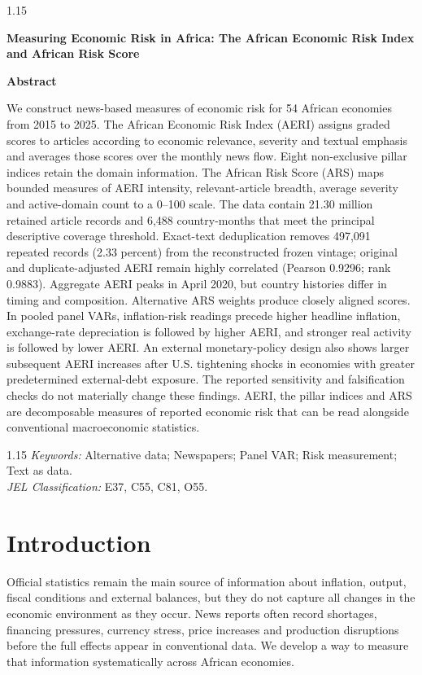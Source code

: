 \documentclass[12pt]{article}
\begin{document}
\thispagestyle{plain}
\begin{center}
\begin{spacing}{1.15}
{\Large\bfseries Measuring Economic Risk in Africa: The African Economic Risk Index and African Risk Score\par}
\end{spacing}
\end{center}
\begin{center}\textbf{Abstract}\end{center}\vspace{-6pt}
\noindent We construct news-based measures of economic risk for 54 African economies from 2015 to 2025. The African Economic Risk Index (AERI) assigns graded scores to articles according to economic relevance, severity and textual emphasis and averages those scores over the monthly news flow. Eight non-exclusive pillar indices retain the domain information. The African Risk Score (ARS) maps bounded measures of AERI intensity, relevant-article breadth, average severity and active-domain count to a 0--100 scale. The data contain 21.30 million retained article records and 6,488 country-months that meet the principal descriptive coverage threshold. Exact-text deduplication removes 497,091 repeated records (2.33 percent) from the reconstructed frozen vintage; original and duplicate-adjusted AERI remain highly correlated (Pearson 0.9296; rank 0.9883). Aggregate AERI peaks in April 2020, but country histories differ in timing and composition. Alternative ARS weights produce closely aligned scores. In pooled panel VARs, inflation-risk readings precede higher headline inflation, exchange-rate depreciation is followed by higher AERI, and stronger real activity is followed by lower AERI. An external monetary-policy design also shows larger subsequent AERI increases after U.S. tightening shocks in economies with greater predetermined external-debt exposure. The reported sensitivity and falsification checks do not materially change these findings. AERI, the pillar indices and ARS are decomposable measures of reported economic risk that can be read alongside conventional macroeconomic statistics.

\begin{spacing}{1.15}
\noindent\textit{Keywords:} Alternative data; Newspapers; Panel VAR; Risk measurement; Text as data.\\
\textit{JEL Classification:} E37, C55, C81, O55.
\end{spacing}
\newpage


\section{Introduction}\label{sec:introduction}
Official statistics remain the main source of information about inflation, output, fiscal conditions and external balances, but they do not capture all changes in the economic environment as they occur. News reports often record shortages, financing pressures, currency stress, price increases and production disruptions before the full effects appear in conventional data. We develop a way to measure that information systematically across African economies.
\end{document}
